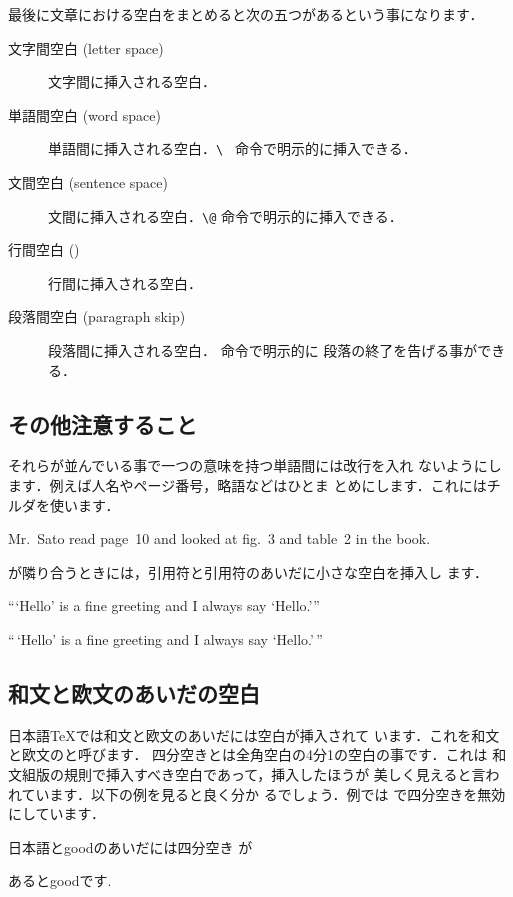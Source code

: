 {最後に文章における空白をまとめると次の五つがあるという事になります．
%
%
%
%
%
%
\begin{description}
 \item[文字間空白 ({letter space})] 
   文字間に挿入される空白．
 \item[単語間空白 ({word space})] 
  単語間に挿入される空白．\verb*|\ | 命令で明示的に挿入できる．
 \item[文間空白 ({sentence space})]   
   文間に挿入される空白．\verb*|\@| 命令で明示的に挿入できる．
 \item[行間空白 ()]  
   行間に挿入される空白．
%
 \item[段落間空白 (paragraph skip)] 
   段落間に挿入される空白． 命令で明示的に
   段落の終了を告げる事ができる．
\end{description}


\subsection{その他注意すること}
それらが並んでいる事で一つの意味を持つ単語間には改行を入れ
ないようにします．例えば人名やページ番号，略語などはひとま
とめにします．これにはチルダ\qu{\str{~}}を使います．
%
\begin{InOut}
Mr.~Sato read page~10 and looked 
at fig.~3 and table~2 in the book.
\end{InOut}

が隣り合うときには，引用符と引用符のあいだに小さな空白を挿入し
ます．

\begin{InOut}
```Hello' is a fine greeting and I 
always say `Hello.''' \par 
``\,`Hello' is a fine greeting and
 I always say `Hello.'\,''  
\end{InOut}



\subsection{和文と欧文のあいだの空白}
日本語{\TeX}では和文と欧文のあいだには空白が挿入されて
います．これを和文と欧文の{}と呼びます．
四分空きとは全角空白の4分1の空白の事です．これは
和文組版の規則で挿入すべき空白であって，挿入したほうが
美しく見えると言われています．以下の例を見ると良く分か
るでしょう．例では  で四分空きを無効にしています．
\begin{InOut}
日本語とgoodのあいだには四分空き
が\par あると\mbox{}good\mbox{}です.
\end{InOut}

}

